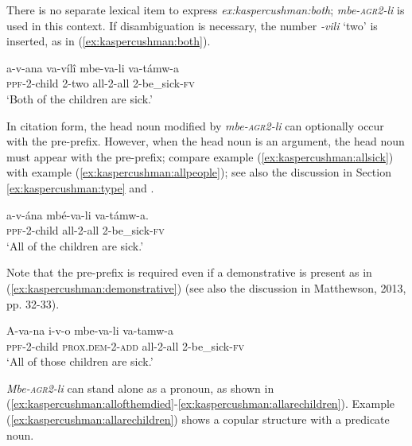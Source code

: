 \documentclass[letterpaper, 12pt]{article}
\begin{document}
There is no separate lexical item to express \textit{ex:kaspercushman:both}; \textit{mbe-\textsc{agr2}-li} is used in this context.  If disambiguation is necessary, the number \textit{-vili} `two' is inserted, as in (\ref{ex:kaspercushman:both}).

\begin{exe} 

\ex \gll a-v-ana va-v\'il\^i mbe-va-li va-t\'amw-a \\ 
\textsc{ppf}-2-child 2-two all-2-all 2-be\_sick-\textsc{fv} \\ \label{ex:kaspercushman:both}
`Both of the children are sick.' \\

\end{exe}


In citation form, the head noun modified by \textit{mbe-\textsc{agr2}-li} can optionally occur with the pre-prefix.  However, when the head noun is an argument, the head noun must appear with the pre-prefix; compare example (\ref{ex:kaspercushman:allsick}) with example (\ref{ex:kaspercushman:allpeople}); see also the discussion in Section \ref{ex:kaspercushman:type} and \citealt{gambarage16}. 
 
\begin{exe}
\ex \gll a-v-\'ana mb\'e-va-li va-t\'amw-a. \\
\textsc{ppf}-2-child all-2-all 2-be\_sick-\textsc{fv} \\
`All of the children are sick.' \\ \label{ex:kaspercushman:allsick}
\end{exe}

Note that the pre-prefix is required even if a demonstrative is present as in (\ref{ex:kaspercushman:demonstrative}) (see also the discussion in Matthewson, 2013, pp. 32-33). 
\begin{exe}

\ex \label{ex:kaspercushman:demonstrative}\gll A-va-na i-v-o mbe-va-li va-tamw-a \\
\textsc{ppf}-2-child \textsc{prox.dem}-2-\textsc{add} all-2-all 2-be\_sick-\textsc{fv} \\
`All of those children are sick.' \\
\end{exe}


\textit{Mbe-\textsc{agr2}-li} can stand alone as a pronoun, as shown in (\ref{ex:kaspercushman:allofthemdied}-\ref{ex:kaspercushman:allarechildren}).  Example (\ref{ex:kaspercushman:allarechildren}) shows a copular structure with a predicate noun. 
\end{document}
